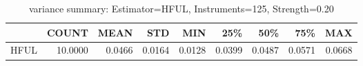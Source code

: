 \begin{table}[ht]
\centering
\caption{variance summary: Estimator=HFUL, Instruments=125, Strength=0.20}
\begin{tabular}{lrrrrrrrr}
\toprule
 & COUNT & MEAN & STD & MIN & 25\% & 50\% & 75\% & MAX \\
\midrule
HFUL & 10.0000 & 0.0466 & 0.0164 & 0.0128 & 0.0399 & 0.0487 & 0.0571 & 0.0668 \\
\bottomrule
\end{tabular}
\end{table}
